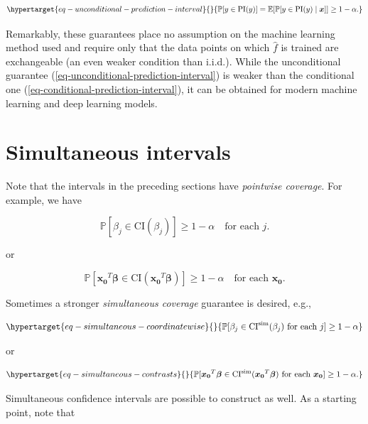 \documentclass[
  11pt,
  letterpaper,
  oneside]{book}
\theoremstyle{definition}
\theoremstyle{plain}
\theoremstyle{plain}
\theoremstyle{plain}
\theoremstyle{remark}
\begin{document}
\begin{equation}\protect\hypertarget{eq-unconditional-prediction-interval}{}{
\mathbb{P}[y \in \text{PI}(y)] = \mathbb{E}[\mathbb{P}[y \in \text{PI}(y) \mid \boldsymbol{x}]] \geq 1-\alpha.
}\label{eq-unconditional-prediction-interval}\end{equation}

Remarkably, these guarantees place no assumption on the machine learning
method used and require only that the data points on which
\(\widehat{f}\) is trained are exchangeable (an even weaker condition
than i.i.d.). While the unconditional guarantee
(\ref{eq-unconditional-prediction-interval}) is weaker than the
conditional one (\ref{eq-conditional-prediction-interval}), it can be
obtained for modern machine learning and deep learning models.

\hypertarget{simultaneous-intervals}{%
\section{Simultaneous intervals}\label{simultaneous-intervals}}

Note that the intervals in the preceding sections have \emph{pointwise
coverage}. For example, we have

\[
\mathbb{P}[\beta_j \in \text{CI}(\beta_j)] \geq 1-\alpha \quad \text{for each } j.
\]

or

\[
\mathbb{P}[\boldsymbol{x_0}^T \boldsymbol{\beta} \in \text{CI}(\boldsymbol{x_0}^T \boldsymbol{\beta})] \geq 1-\alpha \quad \text{for each } \boldsymbol{x_0}.
\]

Sometimes a stronger \emph{simultaneous coverage} guarantee is desired,
e.g.,

\begin{equation}\protect\hypertarget{eq-simultaneous-coordinatewise}{}{
\mathbb{P}[\beta_j \in \text{CI}^{\text{sim}}(\beta_j) \ \text{for each } j] \geq 1-\alpha
}\label{eq-simultaneous-coordinatewise}\end{equation}

or

\begin{equation}\protect\hypertarget{eq-simultaneous-contrasts}{}{
\mathbb{P}[\boldsymbol{x_0}^T \boldsymbol{\beta} \in \text{CI}^{\text{sim}}(\boldsymbol{x_0}^T \boldsymbol{\beta}) \ \text{for each } \boldsymbol{x_0}] \geq 1-\alpha.
}\label{eq-simultaneous-contrasts}\end{equation}

Simultaneous confidence intervals are possible to construct as well. As
a starting point, note that
\end{document}
